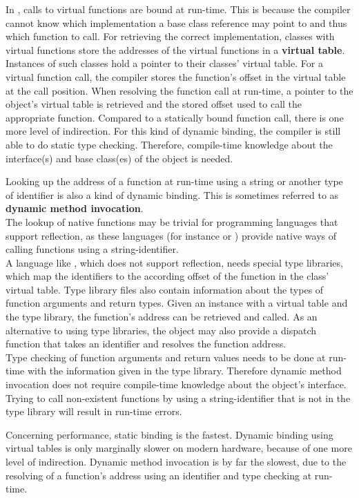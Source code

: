 In , calls to virtual functions are bound at run-time. This is because the compiler cannot know which implementation a base class reference may point to and thus which function to call. For retrieving the correct implementation, classes with virtual functions store the addresses of the virtual functions in a \textbf{virtual table}. Instances of such classes hold a pointer to their classes' virtual table. For a virtual function call, the compiler stores the function's offset in the virtual table at the call position. When resolving the function call at run-time, a pointer to the object's virtual table is retrieved and the stored offset used to call the appropriate function. Compared to a statically bound function call, there is one more level of indirection. For this kind of dynamic binding, the compiler is still able to do static type checking. Therefore, compile-time knowledge about the interface(s) and base class(es) of the object is needed. 

Looking up the address of a function at run-time using a string or another type of identifier is also a kind of dynamic binding. This is sometimes referred to as \textbf{dynamic method invocation}.\\
The lookup of native functions may be trivial for programming languages that support reflection, as these languages (for instance  or ) provide native ways of calling functions using a string-identifier.\\
A language like , which does not support reflection, needs special type libraries, which map the identifiers to the according offset of the function in the class' virtual table. Type library files also contain information about the types of function arguments and return types. Given an instance with a virtual table and the type library, the function's address can be retrieved and called. As an alternative to using type libraries, the object may also provide a dispatch function that takes an identifier and resolves the function address.
\\Type checking of function arguments and return values needs to be done at run-time with the information given in the type library. Therefore dynamic method invocation does not require compile-time knowledge about the object's interface. Trying to call non-existent functions by using a string-identifier that is not in the type library will result in run-time errors.

Concerning performance, static binding is the fastest. Dynamic binding using virtual tables is only marginally slower on modern hardware, because of one more level of indirection. Dynamic method invocation is by far the slowest, due to the resolving of a function's address using an identifier and type checking at run-time. 

